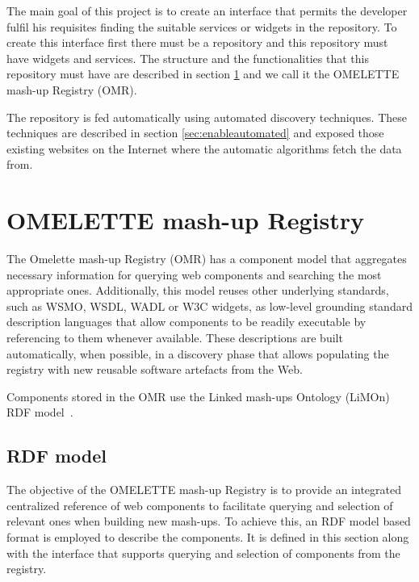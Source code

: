 The main goal of this project is to create an interface that permits the developer fulfil his requisites finding the suitable services or widgets in the repository. To create this interface first there must be a repository and this repository must have widgets and services. The structure and the functionalities that this repository must have are described in section \ref{sec:enableomr} and we call it the OMELETTE mash-up Registry (OMR).

The repository is fed automatically using automated discovery techniques. These techniques are described in section \ref{sec:enableautomated} and exposed those existing websites on the Internet where the automatic algorithms fetch the data from.

\section{OMELETTE mash-up Registry}
\label{sec:enableomr}

The Omelette mash-up Registry (OMR) has a component model that aggregates necessary information for querying web components and searching the most appropriate ones. Additionally, this model reuses other underlying standards, such as WSMO, WSDL, WADL or W3C widgets, as low-level grounding standard description languages that allow components to be readily executable by referencing to them whenever available. These descriptions are built automatically, when possible, in a discovery phase that allows populating the registry with new reusable software artefacts from the Web.

Components stored in the OMR use the Linked mash-ups Ontology (LiMOn) RDF model~\cite{limon}.


\subsection{RDF model}
\label{subsec:rdfmodel}

The objective of the OMELETTE mash-up Registry is to provide an integrated centralized reference of web components to
facilitate querying and selection of relevant ones when building new mash-ups. To achieve this, an RDF model based format is employed to describe the components. It is defined in this section along with the interface that supports querying and selection of components from the registry.

